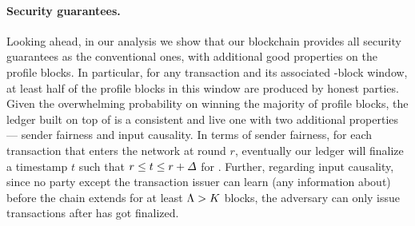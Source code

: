 \paragraph{Security guarantees.}
%
Looking ahead, in our analysis we show that our blockchain \chain provides all security guarantees as the conventional ones, with additional good properties on the profile blocks.
%
In particular, for any transaction \tx and its associated \PBWindowLen-block window, at least half of the profile blocks in this window are produced by honest parties.
%
Given the overwhelming probability on winning the majority of profile blocks, the ledger built on top of \chain is a consistent and live one with two additional properties --- sender fairness and input causality.
%
In terms of sender fairness, for each transaction \tx that enters the network at round $r$, eventually our ledger will finalize a timestamp $t$ such that $r \le t \le r + \varDelta$ for \tx.
%
Further, regarding input causality, since no party except the transaction issuer can learn (any information about) \tx before the chain extends for at least $\Lambda > K$ blocks, the adversary can only issue transactions after \tx has got finalized.
